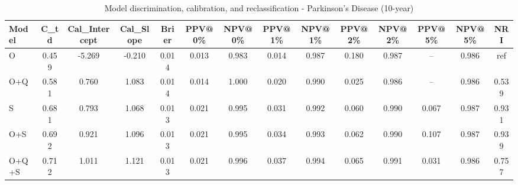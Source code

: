 \begin{table}[htbp]
\centering
\small
\caption{Model discrimination, calibration, and reclassification - Parkinson's Disease (10-year)}
\label{tab:perf_pd_10y}
\begin{tabular}{lccccccccccccc}
\toprule
Model & C\_td & Cal\_Intercept & Cal\_Slope & Brier & PPV@0\% & NPV@0\% & PPV@1\% & NPV@1\% & PPV@2\% & NPV@2\% & PPV@5\% & NPV@5\% & NRI \\
\midrule
O & 0.459 & -5.269 & -0.210 & 0.014 & 0.013 & 0.983 & 0.014 & 0.987 & 0.180 & 0.987 & -- & 0.986 & ref \\
O+Q & 0.581 & 0.760 & 1.083 & 0.014 & 0.014 & 1.000 & 0.020 & 0.990 & 0.025 & 0.986 & -- & 0.986 & 0.539 \\
S & 0.681 & 0.793 & 1.068 & 0.013 & 0.021 & 0.995 & 0.031 & 0.992 & 0.060 & 0.990 & 0.067 & 0.987 & 0.931 \\
O+S & 0.692 & 0.921 & 1.096 & 0.013 & 0.021 & 0.995 & 0.034 & 0.993 & 0.062 & 0.990 & 0.107 & 0.987 & 0.939 \\
O+Q+S & 0.712 & 1.011 & 1.121 & 0.013 & 0.021 & 0.996 & 0.037 & 0.994 & 0.065 & 0.991 & 0.031 & 0.986 & 0.757 \\
\bottomrule
\end{tabular}
\end{table}